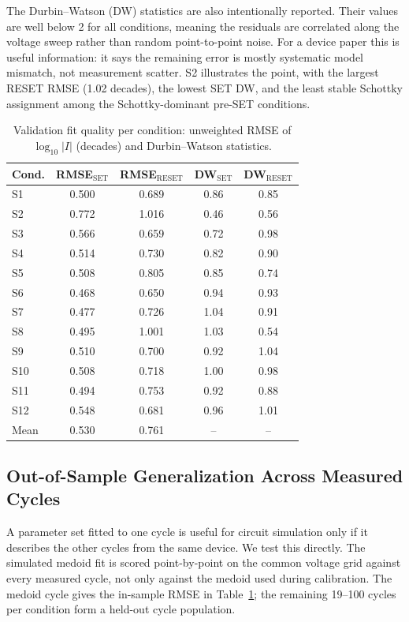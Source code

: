 \documentclass[journal]{IEEEtran}
\begin{document}
The Durbin--Watson (DW) statistics are also intentionally reported.  Their
values are well below 2 for all conditions, meaning the residuals are
correlated along the voltage sweep rather than random point-to-point noise.
For a device paper this is useful information: it says the remaining error is
mostly systematic model mismatch, not measurement scatter.  S2 illustrates
the point, with the largest RESET RMSE (1.02 decades), the lowest SET DW, and
the least stable Schottky assignment among the Schottky-dominant pre-SET
conditions.

\begin{table}[!t]
\centering
\caption{Validation fit quality per condition: unweighted RMSE of
$\log_{10}|I|$ (decades) and Durbin--Watson statistics.}
\label{tab:fitquality}
\footnotesize
\begin{tabular}{@{}lcccc@{}}
\toprule
Cond. & RMSE$_{\mathrm{SET}}$ & RMSE$_{\mathrm{RESET}}$ &
DW$_{\mathrm{SET}}$ & DW$_{\mathrm{RESET}}$\\
\midrule
S1  & 0.500 & 0.689 & 0.86 & 0.85\\
S2  & 0.772 & 1.016 & 0.46 & 0.56\\
S3  & 0.566 & 0.659 & 0.72 & 0.98\\
S4  & 0.514 & 0.730 & 0.82 & 0.90\\
S5  & 0.508 & 0.805 & 0.85 & 0.74\\
S6  & 0.468 & 0.650 & 0.94 & 0.93\\
S7  & 0.477 & 0.726 & 1.04 & 0.91\\
S8  & 0.495 & 1.001 & 1.03 & 0.54\\
S9  & 0.510 & 0.700 & 0.92 & 1.04\\
S10 & 0.508 & 0.718 & 1.00 & 0.98\\
S11 & 0.494 & 0.753 & 0.92 & 0.88\\
S12 & 0.548 & 0.681 & 0.96 & 1.01\\
\midrule
Mean & 0.530 & 0.761 & -- & --\\
\bottomrule
\end{tabular}
\end{table}

\subsection{Out-of-Sample Generalization Across Measured Cycles}
\label{sec:res-heldout}

A parameter set fitted to one cycle is useful for circuit simulation only if
it describes the other cycles from the same device.  We test this directly.
The simulated medoid fit is scored point-by-point on the common voltage grid
against every measured cycle, not only against the medoid used during
calibration.  The medoid cycle gives the in-sample RMSE in
Table~\ref{tab:fitquality}; the remaining 19--100 cycles per condition form a
held-out cycle population.
\end{document}
